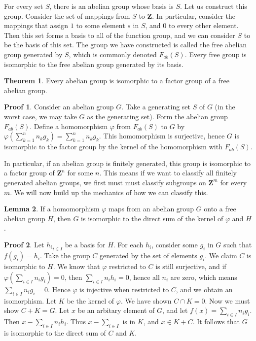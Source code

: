 \documentclass[12pt]{amsbook}
\theoremstyle{definition}
\newtheorem{theorem}{Theorem}[chapter]
\newtheorem{lemma}[theorem]{Lemma}
\newtheorem*{prf}{Proof}
\newcommand{\bint}{\mathbf{Z}} %
\begin{document}
For every set $S$, there is an abelian group whose basis is $S$. Let us construct this group. Consider the set of mappings from $S$ to $\bint$. In particular, consider the mappings that assign $1$ to some element $s$ in $S$, and $0$ to every other element. Then this set forms a basis to all of the function group, and we can consider $S$ to be the basis of this set. The group we have constructed is called the free abelian group generated by $S$, which is commonly denoted $F_{ab}(S)$. Every free group is isomorphic to the free abelian group generated by its basis.

\begin{theorem}
    Every abelian group is isomorphic to a factor group of a free abelian group.
\end{theorem}
\begin{prf}
    Consider an abelian group $G$. Take a generating set $S$ of $G$ (in the worst case, we may take $G$ as the generating set). Form the abelian group $F_{ab}(S)$. Define a homomorphism $\varphi$ from $F_{ab}(S)$ to $G$ by $\varphi(\sum_{k = 1}^n n_kg_k) = \sum_{k = 1}^n n_kg_k$. This homomorphism is surjective, hence $G$ is isomorphic to the factor group by the kernel of the homomorphism with $F_{ab}(S)$.
\end{prf}

In particular, if an abelian group is finitely generated, this group is isomorphic to a factor group of $\bint^n$ for some $n$. This means if we want to classify all finitely generated abelian groups, we first must must classify subgroups on $\bint^m$ for every $m$. We will now build up the mechanics of how we can classify this.

\begin{lemma}
    If a homomorphism $\varphi$ maps from an abelian group $G$ onto a free abelian group $H$, then $G$ is isomorphic to the direct sum of the kernel of $\varphi$ and $H$.
\end{lemma}
\begin{prf}
    Let ${h_i}_{i \in I}$ be a basis for $H$. For each $h_i$, consider some $g_i$ in $G$ such that $f(g_i) = h_i$. Take the group $C$ generated by the set of elements $g_i$. We claim $C$ is isomorphic to $H$. We know that $\varphi$ restricted to $C$ is still surjective, and if $\varphi(\sum_{i \in I} n_ig_i) = 0$, then $\sum_{i \in I} n_ih_i = 0$, hence all $n_i$ are zero, which means $\sum_{i \in I} n_ig_i = 0$. Hence $\varphi$ is injective when restricted to $C$, and we obtain an isomorphism. Let $K$ be the kernel of $\varphi$. We have shown $C \cap K = 0$. Now we must show $C + K = G$. Let $x$ be an arbitary element of $G$, and let $f(x) = \sum_{i \in I} n_ig_i$. Then $x - \sum_{i \in I} n_ih_i$. Thus $x - \sum_{i \in I}$ is in $K$, and $x \in K + C$. It follows that $G$ is isomorphic to the direct sum of $C$ and $K$.
\end{prf}
\end{document}
